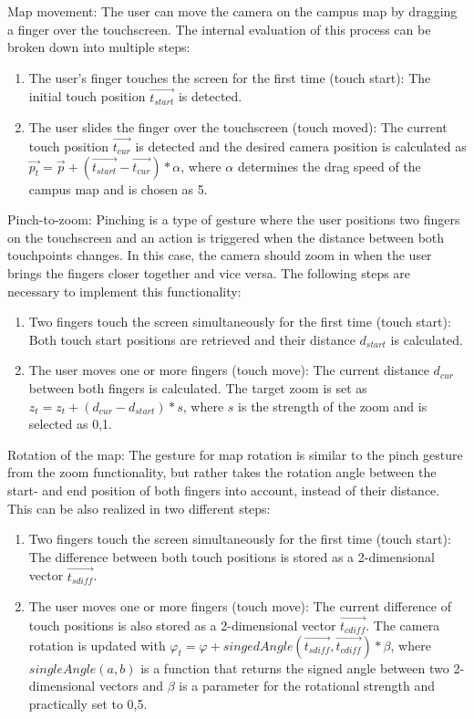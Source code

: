 Map movement: The user can move the camera on the campus map by dragging a finger over the touchscreen. The internal evaluation of this process can be broken down into multiple steps:

\begin{enumerate}
	\item The user's finger touches the screen for the first time (touch start): The initial touch position $\overrightarrow{t_{start}}$ is detected.
	\item The user slides the finger over the touchscreen (touch moved): The current touch position $\overrightarrow{t_{cur}}$ is detected and the desired camera position is calculated as $\overrightarrow{p_{t}} = \overrightarrow{p} + (\overrightarrow{t_{start}} - \overrightarrow{t_{cur}}) * \alpha$, where $\alpha$ determines the drag speed of the campus map and is chosen as 5.
\end{enumerate}

Pinch-to-zoom: Pinching is a type of gesture where the user positions two fingers on the touchscreen and an action is triggered when the distance between both touchpoints changes. In this case, the camera should zoom in when the user brings the fingers closer together and vice versa. The following steps are necessary to implement this functionality:

\begin{enumerate}
	\item Two fingers touch the screen simultaneously for the first time (touch start): Both touch start positions are retrieved and their distance $d_{start}$ is calculated.
	\item The user moves one or more fingers (touch move): The current distance $d_{cur}$ between both fingers is calculated. The target zoom is set as $z_{t} = z_{t} + (d_{cur} - d_{start}) * s$, where $s$ is the strength of the zoom and is selected as 0,1.
\end{enumerate}

Rotation of the map: The gesture for map rotation is similar to the pinch gesture from the zoom functionality, but rather takes the rotation angle between the start- and end position of both fingers into account, instead of their distance. This can be also realized in two different steps:

\begin{enumerate}
	\item Two fingers touch the screen simultaneously for the first time (touch start): The difference between both touch positions is stored as a 2-dimensional vector $\overrightarrow{t_{sdiff}}$.
	\item  The user moves one or more fingers (touch move): The current difference of touch positions is also stored as a 2-dimensional vector $\overrightarrow{t_{cdiff}}$. The camera rotation is updated with $\varphi_{t} = \varphi + singedAngle(\overrightarrow{t_{sdiff}}, \overrightarrow{t_{cdiff}}) * \beta$, where $singleAngle(a, b)$ is a function that returns the signed angle between two 2-dimensional vectors and $\beta$ is a parameter for the rotational strength and practically set to 0,5.
\end{enumerate}

